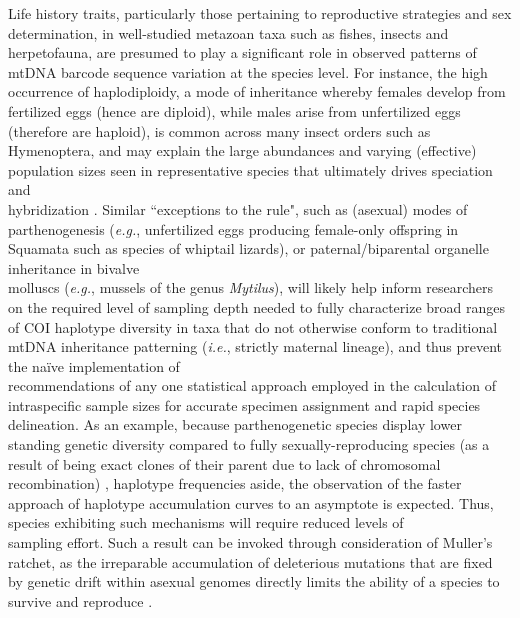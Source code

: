 Life history traits, particularly those pertaining to reproductive strategies and sex \\ determination, in well-studied metazoan taxa such as fishes, insects and herpetofauna, are presumed to play a significant role in observed patterns of mtDNA barcode sequence variation at the species level. For instance, the high occurrence of haplodiploidy, a mode of inheritance whereby females develop from fertilized eggs (hence are diploid), while males arise from unfertilized eggs (therefore are haploid), is common across many insect orders such as Hymenoptera, and may explain the large abundances and varying (effective) population sizes seen in representative species that ultimately drives speciation and \\ hybridization \cite{hebert2016counting}. Similar ``exceptions to the rule", such as (asexual) modes of \\ parthenogenesis (\textit{e.g.}, unfertilized eggs producing female-only offspring in Squamata such as species of whiptail lizards), or paternal/biparental organelle inheritance in bivalve \\ molluscs (\textit{e.g.}, mussels of the genus \textit{Mytilus}), will likely help inform researchers on the required level of sampling depth needed to fully characterize broad ranges of COI haplotype diversity in taxa that do not otherwise conform to traditional mtDNA inheritance patterning (\textit{i.e.}, strictly maternal lineage), and thus prevent the na\"ive implementation of \\ recommendations of any one statistical approach employed in the calculation of \\ intraspecific sample sizes for accurate specimen assignment and rapid species delineation. As an example, because parthenogenetic species display lower standing genetic diversity compared to fully sexually-reproducing species (as a result of being exact clones of their parent due to lack of chromosomal recombination) \cite{bengtsson2003genetic}, haplotype frequencies aside, the observation of the faster approach of haplotype accumulation curves to an asymptote is expected. Thus, species exhibiting such mechanisms will require reduced levels of \\ sampling effort. Such a result can be invoked through consideration of Muller's ratchet, as the irreparable accumulation of deleterious mutations that are fixed by genetic drift within asexual genomes directly limits the ability of a species to survive and reproduce \cite{felenstein1974evolutionary, muller1964relation}. 



